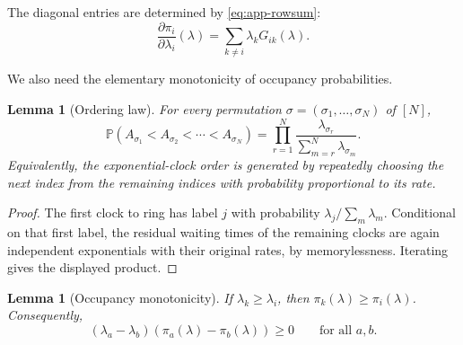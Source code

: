 \documentclass[11pt]{article}
\newtheorem{lemma}[theorem]{Lemma}
\theoremstyle{remark}
\newcommand{\Pp}{\mathbb{P}}
\begin{document}
The diagonal entries are determined by \eqref{eq:app-rowsum}:
\begin{equation}\label{eq:app-diagonal}
        \frac{\partial\pi_i}{\partial\lambda_i}(\lambda)
        =\sum_{k\ne i}\lambda_kG_{ik}(\lambda).
\end{equation}

We also need the elementary monotonicity of occupancy probabilities.

\begin{lemma}[Ordering law]\label{lem:app-ordering-law}
For every permutation $\sigma=(\sigma_1,\ldots,\sigma_N)$ of $[N]$,
\[
        \Pp(A_{\sigma_1}<A_{\sigma_2}<\cdots<A_{\sigma_N})
        =
        \prod_{r=1}^N
        \frac{\lambda_{\sigma_r}}{\sum_{m=r}^N\lambda_{\sigma_m}}.
\]
Equivalently, the exponential-clock order is generated by repeatedly
choosing the next index from the remaining indices with probability
proportional to its rate.
\end{lemma}

\begin{proof}
The first clock to ring has label $j$ with probability
$\lambda_j/\sum_m\lambda_m$.  Conditional on that first label, the
residual waiting times of the remaining clocks are again independent
exponentials with their original rates, by memorylessness.  Iterating
gives the displayed product.
\end{proof}

\begin{lemma}[Occupancy monotonicity]\label{lem:app-mono}
If $\lambda_k\ge\lambda_i$, then $\pi_k(\lambda)\ge\pi_i(\lambda)$.
Consequently,
\[
        \left(\lambda_a-\lambda_b\right)
        \left(\pi_a(\lambda)-\pi_b(\lambda)\right)\ge0
        \qquad\text{for all }a,b.
\]
\end{lemma}
\end{document}
